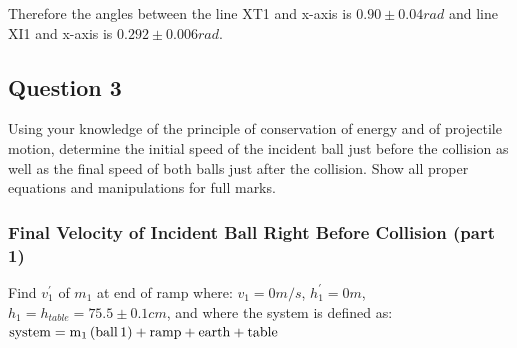 \documentclass[12pt]{article}
\begin{document}
Therefore the angles between the line XT1 and x-axis is $0.90\pm0.04rad$ and line XI1 and x-axis is $0.292\pm0.006rad$.

\pagebreak

\subsection{Question 3}
Using your knowledge of the principle of conservation of energy and of projectile motion, determine the initial speed of the incident ball just before the collision as well as the final speed of both balls just after the collision. Show all proper equations and manipulations for full marks.

\subsubsection{Final Velocity of Incident Ball Right Before Collision (part 1)}
Find $v_{1}^{'}$ of $m_{1}$ at end of ramp where: $v_{1} = 0m/s$, $h_{1}^{'} = 0m$, $h_{1} = h_{table} = 75.5\pm0.1cm$, and where the system is defined as: $\ce{system} = \ce{m_{1} (ball 1) + ramp + earth + table}$
\end{document}
